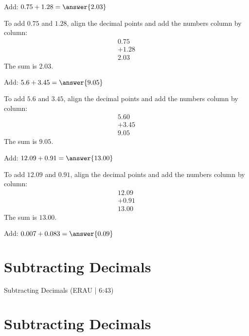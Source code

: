 \documentclass{ximera}
\begin{document}
\begin{problem}
Add: $0.75 + 1.28 = \answer{2.03}$
\begin{feedback}
To add $0.75$ and $1.28$, align the decimal points and add the numbers column by column:
\begin{align*}
  0.75 \\
+ 1.28 \\
\hline
  2.03
\end{align*}
The sum is $2.03$.
\end{feedback}

\begin{problem}
Add: $5.6 + 3.45 = \answer{9.05}$
\begin{feedback}
To add $5.6$ and $3.45$, align the decimal points and add the numbers column by column:
\begin{align*}
  5.60 \\
+ 3.45 \\
\hline
  9.05
\end{align*}
The sum is $9.05$.
\end{feedback}
\end{problem}

\begin{problem}
Add: $12.09 + 0.91 = \answer{13.00}$
\begin{feedback}
To add $12.09$ and $0.91$, align the decimal points and add the numbers column by column:
\begin{align*}
  12.09 \\
+  0.91 \\
\hline
  13.00
\end{align*}
The sum is $13.00$.
\end{feedback}
\end{problem}

\begin{problem}
Add: $0.007 + 0.083 = \answer{0.09}$
\end{problem}


\section*{Subtracting Decimals}

Subtracting Decimals (ERAU | 6:43)



\section*{Subtracting Decimals} 


\end{problem}
\end{document}
